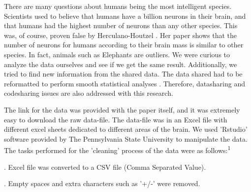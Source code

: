 \documentclass[landscape,final,paperwidth=48in,paperheight=48in,fontscale=0.285]{baposter}
\begin{document}
\begin{poster}
%
    {
      \smaller There are many questions about humans being the most intelligent species. Scientists used to believe that humans have a billion neurons in their brain, and that humans had the highest number of neurons than any other species. This was, of course, proven false by Herculano-Houtzel \cite{herculano-houzel-2015}. Her paper shows that the number of neurons for humans according to their brain mass is similar to other species. In fact, animals such as Elephants are outliers. We were curious to analyze the data ourselves and see if we get the same result. Additionally, we tried to find new information from the shared data. The data shared had to be reformatted to perform smooth statistical analyses \cite{Rstudio}. Therefore, datasharing and codesharing issues are also addressed with this research.
    }
    {
\linespread{1.3} \smaller The link for the data was provided with the paper itself, and it was extremely easy to download the raw data-file. The data-file was in an Excel file with different excel sheets dedicated to different areas of the brain. We used 'Rstudio' software \cite{Rstudio} provided by The Pennsylvania State University to manipulate the data. The tasks performed for the 'cleaning' process of the data were as follows:\textsuperscript{1}

. Excel file was converted to a CSV file (Comma Separated Value).

. Empty spaces and extra characters such as '+/-' were removed.

}
\end{poster}
\end{document}
